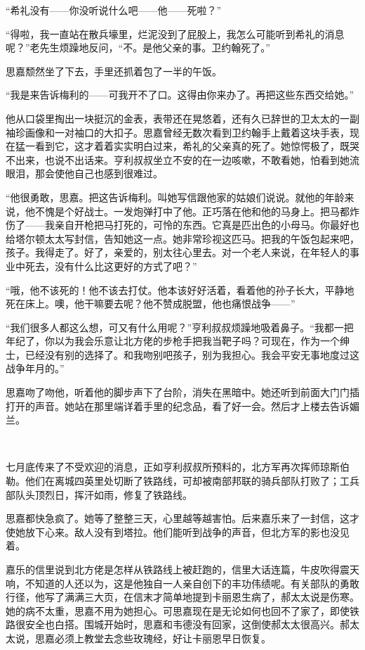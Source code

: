 \par “希礼没有——你没听说什么吧——他——死啦？”
\par “得啦，我一直站在散兵壕里，烂泥没到了屁股上，我怎么可能听到希礼的消息呢？”老先生烦躁地反问，“不。是他父亲的事。卫约翰死了。”
\par 思嘉颓然坐了下去，手里还抓着包了一半的午饭。
\par “我是来告诉梅利的——可我开不了口。这得由你来办了。再把这些东西交给她。”
\par 他从口袋里掏出一块挺沉的金表，表带还在晃悠着，还有久已辞世的卫太太的一副袖珍画像和一对袖口的大扣子。思嘉曾经无数次看到卫约翰手上戴着这块手表，现在猛一看到它，这才着着实实明白过来，希礼的父亲真的死了。她惊愕极了，既哭不出来，也说不出话来。亨利叔叔坐立不安的在一边咳嗽，不敢看她，怕看到她流眼泪，那会使他自己也感到很难过。
\par “他很勇敢，思嘉。把这告诉梅利。叫她写信跟他家的姑娘们说说。就他的年龄来说，他不愧是个好战士。一发炮弹打中了他。正巧落在他和他的马身上。把马都炸伤了——我亲自开枪把马打死的，可怜的东西。它真是匹出色的小母马。你最好也给塔尔顿太太写封信，告知她这一点。她非常珍视这匹马。把我的午饭包起来吧，孩子。我得走了。好了，亲爱的，别太往心里去。对一个老人来说，在年轻人的事业中死去，没有什么比这更好的方式了吧？”
\par “哦，他不该死的！他不该去打仗。他本该好好活着，看着他的孙子长大，平静地死在床上。噢，他干嘛要去呢？他不赞成脱盟，他也痛恨战争——”
\par “我们很多人都这么想，可又有什么用呢？”亨利叔叔烦躁地吸着鼻子。“我都一把年纪了，你以为我会乐意让北方佬的步枪手把我当靶子吗？可现在，作为一个绅士，已经没有别的选择了。和我吻别吧孩子，别为我担心。我会平安无事地度过这战争年月的。”
\par 思嘉吻了吻他，听着他的脚步声下了台阶，消失在黑暗中。她还听到前面大门门插打开的声音。她站在那里端详着手里的纪念品，看了好一会。然后才上楼去告诉媚兰。
\par  
\par 七月底传来了不受欢迎的消息，正如亨利叔叔所预料的，北方军再次挥师琼斯伯勒。他们在离城四英里处切断了铁路线，可却被南部邦联的骑兵部队打败了；工兵部队头顶烈日，挥汗如雨，修复了铁路线。
\par 思嘉都快急疯了。她等了整整三天，心里越等越害怕。后来嘉乐来了一封信，这才使她放下心来。敌人没有到塔拉。他们能听到战争的声音，但北方军的影也没见着。
\par 嘉乐的信里说到北方佬是怎样从铁路线上被赶跑的，信里大话连篇，牛皮吹得震天响，不知道的人还以为，这是他独自一人亲自创下的丰功伟绩呢。有关部队的勇敢行径，他写了满满三大页，在信末才简单地提到卡丽恩生病了，郝太太说是伤寒。她的病不太重，思嘉不用为她担心。可思嘉现在是无论如何也回不了家了，即使铁路很安全也白搭。围城开始时，思嘉和韦德没有回家，这倒使郝太太很高兴。郝太太说，思嘉必须上教堂去念些玫瑰经，好让卡丽恩早日恢复。

